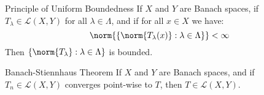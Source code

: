 \documentclass[crop=false,class=article,oneside]{standalone}
\begin{document}
        \begin{ltheorem}{Principle of Uniform Boundedness}
            If $X$ and $Y$ are Banach spaces, if
            $T_{\lambda}\in\mathcal{L}(X,Y)$ for all
            $\lambda\in\Lambda$, and if for all $x\in{X}$ we have:
            \begin{equation}
                \norm{\{\norm{T_{\lambda}(x)}:\lambda\in\Lambda\}}
                <\infty
            \end{equation}
            Then $\{\norm{T_{\lambda}}:\lambda\in\Lambda\}$ is
            bounded.
        \end{ltheorem}
        \begin{ltheorem}{Banach-Stiennhaus Theorem}
            If $X$ and $Y$ are Banach spaces, and if
            $T_{n}\in\mathcal{L}(X,Y)$ converges point-wise to
            $T$, then $T\in\mathcal{L}(X,Y)$.
        \end{ltheorem}
\end{document}
